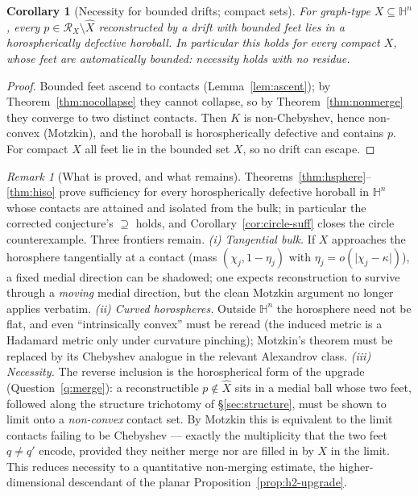 \documentclass[11pt]{article}
\newtheorem{corollary}[theorem]{Corollary}
\theoremstyle{remark}
\newtheorem{remark}[theorem]{Remark}
\newcommand{\X}{X}
\newcommand{\Xhat}{\widehat{\X}}
\newcommand{\Rx}{\mathcal{R}_{\X}}
\begin{document}
\begin{corollary}[Necessity for bounded drifts; compact sets]
\label{cor:compactnec}
For graph-type $\X\subseteq\mathbb{H}^{n}$, every $p\in\Rx\setminus
\Xhat$ reconstructed by a drift with \emph{bounded} feet lies in a
horospherically defective horoball. In particular this holds for every
compact $\X$, whose feet are automatically bounded: necessity holds
with no residue.
\end{corollary}

\begin{proof}
Bounded feet ascend to contacts (Lemma~\ref{lem:ascent}); by
Theorem~\ref{thm:nocollapse} they cannot collapse, so by
Theorem~\ref{thm:nonmerge} they converge to two distinct contacts.
Then $K$ is non-Chebyshev, hence non-convex (Motzkin), and the horoball
is horospherically defective and contains $p$. For compact $\X$ all
feet lie in the bounded set $\X$, so no drift can escape.
\end{proof}

\begin{remark}[What is proved, and what remains]\label{rem:hsuff}
Theorems~\ref{thm:hsphere}--\ref{thm:hiso} prove sufficiency for every
horospherically defective horoball in $\mathbb{H}^{n}$ whose contacts
are attained and isolated from the bulk; in particular the corrected
conjecture's $\supseteq$ holds, and Corollary~\ref{cor:circle-suff}
closes the circle counterexample. Three frontiers remain. \emph{(i)
Tangential bulk.} If $\X$ approaches the horosphere tangentially at a
contact (mass $(\chi_{j},1-\eta_{j})$ with
$\eta_{j}=o(\lvert\chi_{j}-\kappa\rvert)$), a fixed medial direction
can be shadowed; one expects reconstruction to survive through a
\emph{moving} medial direction, but the clean Motzkin argument no
longer applies verbatim. \emph{(ii) Curved horospheres.} Outside
$\mathbb{H}^{n}$ the horosphere need not be flat, and even
``intrinsically convex'' must be reread (the induced metric is a
Hadamard metric only under curvature pinching); Motzkin's theorem must
be replaced by its Chebyshev analogue in the relevant Alexandrov
class. \emph{(iii) Necessity.} The reverse inclusion is the
horospherical form of the upgrade (Question~\ref{q:merge}): a
reconstructible $p\notin\Xhat$ sits in a medial ball whose two feet,
followed along the structure trichotomy of \S\ref{sec:structure},
must be shown to limit onto a \emph{non-convex} contact set. By
Motzkin this is equivalent to the limit contacts failing to be
Chebyshev --- exactly the multiplicity that the two feet $q\neq q'$
encode, provided they neither merge nor are filled in by $\X$ in the
limit. This reduces necessity to a quantitative non-merging estimate,
the higher-dimensional descendant of the planar
Proposition~\ref{prop:h2-upgrade}.
\end{remark}
\end{document}
